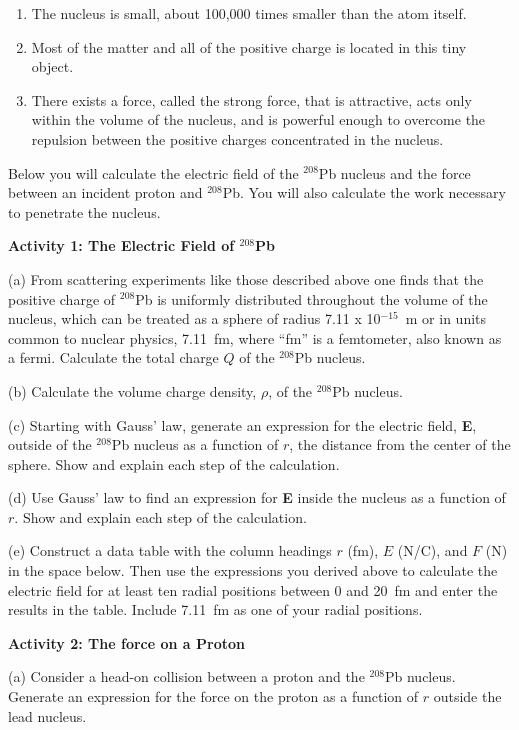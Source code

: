 \begin{enumerate}
\item The nucleus is small, about 100,000 times smaller than the atom itself.
\item Most of the matter and all of the positive charge is located in this
tiny object.
\item There exists a force, called the strong force, that is attractive,
acts only within the volume of the nucleus, and is powerful enough
to overcome the repulsion between the positive charges concentrated
in the nucleus. 
\end{enumerate}
Below you will calculate the electric field of the \( ^{208} \)Pb
nucleus and the force between an incident proton and \( ^{208} \)Pb.
You will also calculate the work necessary to penetrate the nucleus.

\bigskip
\textbf{Activity 1: The Electric Field of \( ^{208} \)Pb}

(a) From scattering experiments like those described above one finds
that the positive charge of \( ^{208} \)Pb is uniformly distributed
throughout the volume of the nucleus, which can be treated as a sphere
of radius 7.11 x 10\( ^{-15} \)~m or in units common to nuclear physics,
7.11~fm, where {}``fm'' is a femtometer, also known as a fermi. Calculate 
the total charge $Q$ of the \( ^{208} \)Pb nucleus.
\answerspace{30mm}

(b) Calculate the volume charge density, \( \rho  \), of the \( ^{208} \)Pb
nucleus.
\answerspace{30mm}

\pagebreak[2]
(c) Starting with Gauss' law, generate an expression for the electric
field, \textbf{E}, outside of the \( ^{208} \)Pb nucleus as a function
of $r$, the distance from the center of the sphere. Show and explain
each step of the calculation.
\answerspace{1.5in}

(d) Use Gauss' law to find an expression for \textbf{E} inside the
nucleus as a function of $r$. Show and explain each step of the calculation.
\answerspace{1.5in}

(e) Construct a data table with the column headings $r$ (fm), $E$ (N/C),
and $F$ (N) in the space below. Then use the expressions you derived
above to calculate the electric field for at least ten radial positions
between 0 and 20~fm and enter the results in the table. Include 7.11~fm 
as one of your radial positions.
\answerspace{2.3in}

\textbf{Activity 2: The force on a Proton}

(a) Consider a head-on collision between a proton and the \( ^{208} \)Pb
nucleus. Generate an expression for the force on the proton as a function
of $r$ outside the lead nucleus.
\answerspace{20mm}

